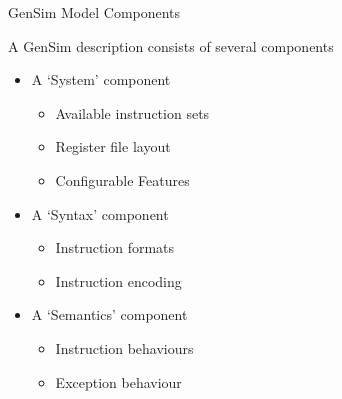 \begin{frame}{GenSim Model Components}

A GenSim description consists of several components
\begin{itemize}
\pause
\item A `System' component
\begin{itemize}
\item Available instruction sets
\item Register file layout
\item Configurable Features
\end{itemize}
\pause
\item A `Syntax' component
\begin{itemize}
\item Instruction formats
\item Instruction encoding
\end{itemize}
\pause
\item A `Semantics' component
\begin{itemize}
\item Instruction behaviours
\item Exception behaviour
\end{itemize}

\end{itemize}

\end{frame}
